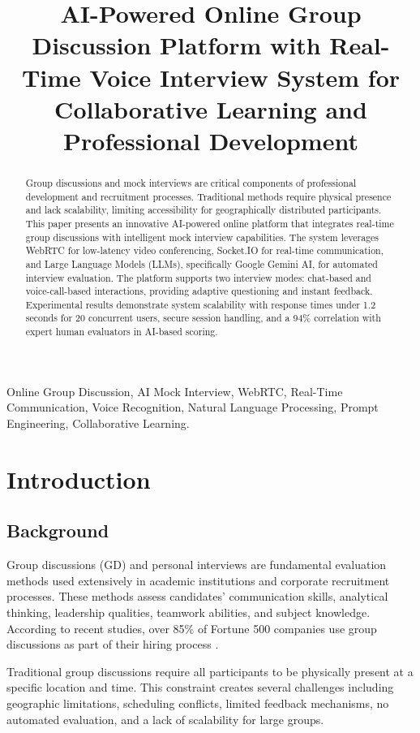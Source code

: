 \documentclass[conference]{IEEEtran}
\title{AI-Powered Online Group Discussion Platform with Real-Time Voice Interview System for Collaborative Learning and Professional Development}
\author{
\IEEEauthorblockN{Javed Hallikeri}
\IEEEauthorblockA{
Department of Computer Science and Engineering\\
B.Tech Computer Science\\
India\\
Email: javedhallikeri3993@gmail.com}
}
\begin{document}
\maketitle

\begin{abstract}
Group discussions and mock interviews are critical components of professional development and recruitment processes. Traditional methods require physical presence and lack scalability, limiting accessibility for geographically distributed participants. This paper presents an innovative AI-powered online platform that integrates real-time group discussions with intelligent mock interview capabilities. The system leverages WebRTC for low-latency video conferencing, Socket.IO for real-time communication, and Large Language Models (LLMs), specifically Google Gemini AI, for automated interview evaluation. The platform supports two interview modes: chat-based and voice-call-based interactions, providing adaptive questioning and instant feedback. Experimental results demonstrate system scalability with response times under 1.2 seconds for 20 concurrent users, secure session handling, and a 94\% correlation with expert human evaluators in AI-based scoring.
\end{abstract}

\begin{IEEEkeywords}
Online Group Discussion, AI Mock Interview, WebRTC, Real-Time Communication, Voice Recognition, Natural Language Processing, Prompt Engineering, Collaborative Learning.
\end{IEEEkeywords}

\section{Introduction}

\subsection{Background}
Group discussions (GD) and personal interviews are fundamental evaluation methods used extensively in academic institutions and corporate recruitment processes. These methods assess candidates' communication skills, analytical thinking, leadership qualities, teamwork abilities, and subject knowledge. According to recent studies, over 85\% of Fortune 500 companies use group discussions as part of their hiring process \cite{b7}.

Traditional group discussions require all participants to be physically present at a specific location and time. This constraint creates several challenges including geographic limitations, scheduling conflicts, limited feedback mechanisms, no automated evaluation, and a lack of scalability for large groups.
\end{document}
